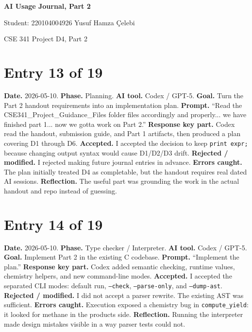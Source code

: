 \documentclass[11pt,a4paper]{article}
\newcommand{\code}[1]{\texttt{#1}}
\begin{document}
\begin{center}
{\huge\bfseries AI Usage Journal, Part 2\par}
{\large Student: 220104004926 Yusuf Hamza Çelebi\par}
{\footnotesize\color{anscaption}CSE 341 Project D4, Part 2}
\end{center}

\section*{Entry 13 of 19}
\textbf{Date.} 2026-05-10.
\textbf{Phase.} Planning.
\textbf{AI tool.} Codex / GPT-5.
\textbf{Goal.} Turn the Part 2 handout requirements into an implementation plan.
\textbf{Prompt.} ``Read the CSE341\_Project\_Guidance\_Files folder files accordingly and properly... we have finished part 1... now we gotta work on Part 2.''
\textbf{Response key part.} Codex read the handout, submission guide, and Part 1 artifacts, then produced a plan covering D1 through D6.
\textbf{Accepted.} I accepted the decision to keep \code{print expr;} because changing output syntax would cause D1/D2/D3 drift.
\textbf{Rejected / modified.} I rejected making future journal entries in advance.
\textbf{Errors caught.} The plan initially treated D4 as completable, but the handout requires real dated AI sessions.
\textbf{Reflection.} The useful part was grounding the work in the actual handout and repo instead of guessing.

\section*{Entry 14 of 19}
\textbf{Date.} 2026-05-10.
\textbf{Phase.} Type checker / Interpreter.
\textbf{AI tool.} Codex / GPT-5.
\textbf{Goal.} Implement Part 2 in the existing C codebase.
\textbf{Prompt.} ``Implement the plan.''
\textbf{Response key part.} Codex added semantic checking, runtime values, chemistry helpers, and new command-line modes.
\textbf{Accepted.} I accepted the separated CLI modes: default run, \code{--check}, \code{--parse-only}, and \code{--dump-ast}.
\textbf{Rejected / modified.} I did not accept a parser rewrite. The existing AST was sufficient.
\textbf{Errors caught.} Execution exposed a chemistry bug in \code{compute\_yield}: it looked for methane in the products side.
\textbf{Reflection.} Running the interpreter made design mistakes visible in a way parser tests could not.
\end{document}
